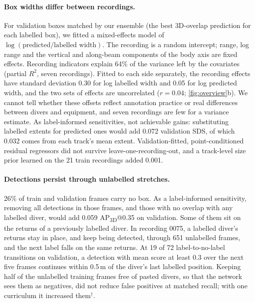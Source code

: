 \documentclass[10pt,twocolumn,letterpaper]{article}
\makeatletter
\newcommand{\sds}{\mbox{SDS}}
\newcommand{\apt}[1]{\mbox{AP\textsubscript{3D}@#1}}
\makeatother
\begin{document}
\paragraph{Box widths differ between recordings.}
For validation boxes matched by our ensemble (the best 3D-overlap prediction for each labelled box), we fitted a mixed-effects model of $\log(\text{predicted}/\text{labelled width})$.
The recording is a random intercept; range, log range and the vertical and along-beam components of the body axis are fixed effects.
Recording indicators explain 64\% of the variance left by the covariates (partial $R^2$, seven recordings).
Fitted to each side separately, the recording effects have standard deviation 0.30 for log labelled width and 0.05 for log predicted width, and the two sets of effects are uncorrelated ($r=0.04$; \cref{fig:overview}b).
We cannot tell whether these offsets reflect annotation practice or real differences between divers and equipment, and seven recordings are few for a variance estimate.
As label-informed sensitivities, not achievable gains: substituting labelled extents for predicted ones would add 0.072 validation \sds{}, of which 0.032 comes from each track's mean extent.
Validation-fitted, point-conditioned residual regressors did not survive leave-one-recording-out, and a track-level size prior learned on the 21 train recordings added 0.001.

\paragraph{Detections persist through unlabelled stretches.}
26\% of train and validation frames carry no box.
As a label-informed sensitivity, removing all detections in those frames, and those with no overlap with any labelled diver, would add 0.059 \apt{0.35} on validation.
Some of them sit on the returns of a previously labelled diver.
In recording 0075, a labelled diver's returns stay in place, and keep being detected, through 651 unlabelled frames, and the next label falls on the same returns.
At 19 of 72 label-to-no-label transitions on validation, a detection with mean score at least 0.3 over the next five frames continues within 0.5\,m of the diver's last labelled position.
Keeping half of the unlabelled training frames free of pasted divers, so that the network sees them as negatives, did not reduce false positives at matched recall; with one curriculum it increased them$^\dagger$.
\end{document}
